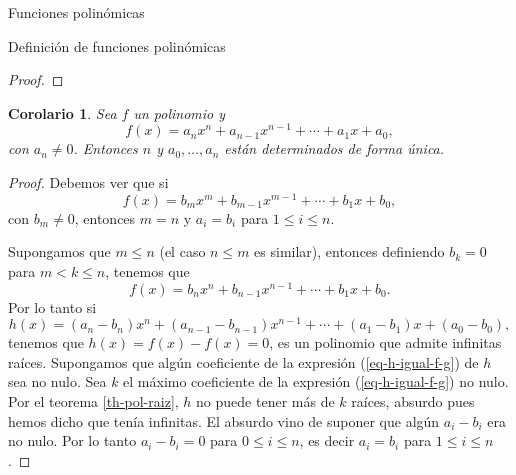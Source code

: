 \documentclass[a4paper,12pt,twoside,spanish]{amsbook}
\newtheorem{corolario}[teorema]{Corolario}
\theoremstyle{definition}
\theoremstyle{remark}
\newcommand{\K}{\mathbb K}
\begin{document}
\begin{chapter}{Funciones polinómicas}
\begin{section}{Definición de funciones polinómicas}
\begin{proof}
\begin{comment}
			Sea $n >0$. Supongamos que el resultado es cierto para los polinomios de grado  $\le n-1$ (hipótesis inductiva). Si $f$ no tiene raíces, está probado nuestro enunciado. En  caso contrario existe $c_1 \in \K$ tal que $f(c_1) =0$. Por el teorema \ref{th-fact-raiz}, 
			\begin{equation*}
			f(x) = (x-c_1)h_1(x)
			\end{equation*}
			con $h_1$ un polinomio de grado $\le n-1$. Luego, por hipótesis inductiva
			\begin{equation*}
			h_1(x) = (x-d_1)(x-d_2)\cdots(x-d_r)g_r,
			\end{equation*} 
			con $r \le n-1$ y $g_r$ que no tiene raíces. Entonces,
			\begin{equation*}
			f(x) = (x-c_1)(x-d_1)(x-d_2)\cdots(x-d_r)g_r,
			\end{equation*}
			con $r \le n-1$ y $g_r$ que no tiene raíces. Esto es equivalente a (\ref{eq-desc-rai}).   
		\end{comment}
		
	\end{proof}
						
	\begin{corolario}
		Sea $f$ un polinomio y 
		\begin{equation*}
			f(x) = a_nx^n + a_{n-1}x^{n-1}+\cdots + a_1x +a_0,
		\end{equation*}
		con $a_n \ne 0$.  Entonces $n$ y $a_0,\ldots,a_n$ están determinados de forma única.
	\end{corolario}
	\begin{proof}
		Debemos ver que si 
		\begin{equation*}
		f(x) = b_mx^m + b_{m-1}x^{m-1}+\cdots + b_1x +b_0,
		\end{equation*}
		con $b_m \ne 0$, entonces $m=n$ y $a_i=b_i$ para $1 \le i \le n$. 
		
		Supongamos que $m \le n$ (el caso $n \le m$ es similar), entonces definiendo $b_k=0$ para $m < k \le n$, tenemos que
		\begin{equation*}
		f(x) = b_nx^n + b_{n-1}x^{n-1}+\cdots + b_1x +b_0.
		\end{equation*}
		Por lo tanto si 
		\begin{equation}\label{eq-h-igual-f-g}
			h(x) = (a_n- b_n)x^n + (a_{n-1}-b_{n-1})x^{n-1}+\cdots + (a_{1}-b_{1})x +(a_{0}-b_{0}), 
		\end{equation}
		tenemos  que $h(x)= f(x)-f(x)=0$,  es un polinomio que admite infinitas raíces. 
		Supongamos  que algún coeficiente de la expresión (\ref{eq-h-igual-f-g}) de $h$ sea no nulo. Sea $k$  el máximo coeficiente de la expresión (\ref{eq-h-igual-f-g}) no nulo. Por el teorema   \ref{th-pol-raiz}, $h$ no  puede tener más de $k$ raíces, absurdo pues hemos dicho que tenía infinitas. El absurdo vino de suponer que algún $a_i-b_i$ era no nulo. Por lo tanto $a_i -b_i=0$ para $0 \le i \le n$,  es decir $a_i=b_i$ para $1 \le i \le n$. 
		

\end{proof}
\end{section}
\end{chapter}
\end{document}
